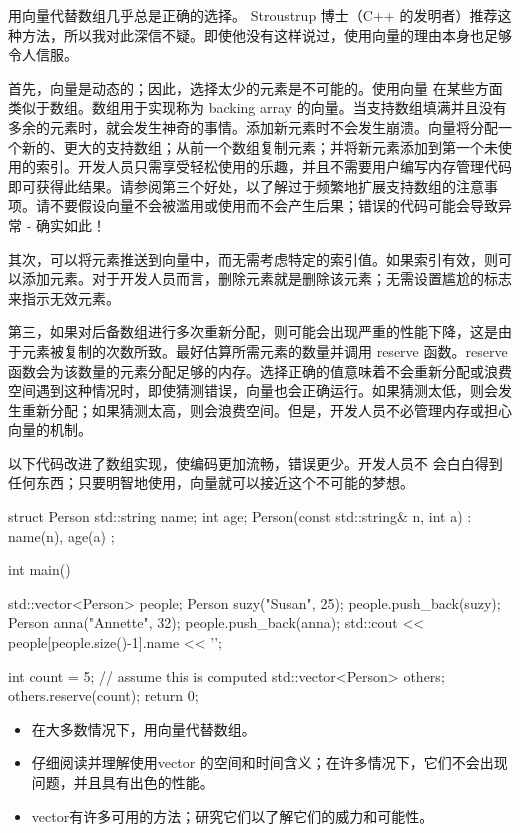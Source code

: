 
用向量代替数组几乎总是正确的选择。 Stroustrup 博士（C++ 的发明者）推荐这种方法，所以我对此深信不疑。即使他没有这样说过，使用向量的理由本身也足够令人信服。

首先，向量是动态的；因此，选择太少的元素是不可能的。使用向量 在某些方面类似于数组。数组用于实现称为 backing array 的向量。当支持数组填满并且没有多余的元素时，就会发生神奇的事情。添加新元素时不会发生崩溃。向量将分配一个新的、更大的支持数组；从前一个数组复制元素；并将新元素添加到第一个未使用的索引。开发人员只需享受轻松使用的乐趣，并且不需要用户编写内存管理代码即可获得此结果。请参阅第三个好处，以了解过于频繁地扩展支持数组的注意事项。请不要假设向量不会被滥用或使用而不会产生后果；错误的代码可能会导致异常 - 确实如此！

其次，可以将元素推送到向量中，而无需考虑特定的索引值。如果索引有效，则可以添加元素。对于开发人员而言，删除元素就是删除该元素；无需设置尴尬的标志来指示无效元素。

第三，如果对后备数组进行多次重新分配，则可能会出现严重的性能下降，这是由于元素被复制的次数所致。最好估算所需元素的数量并调用 reserve 函数。reserve 函数会为该数量的元素分配足够的内存。选择正确的值意味着不会重新分配或浪费空间遇到这种情况时，即使猜测错误，向量也会正确运行。如果猜测太低，则会发生重新分配；如果猜测太高，则会浪费空间。但是，开发人员不必管理内存或担心向量的机制。

以下代码改进了数组实现，使编码更加流畅，错误更少。开发人员不 会白白得到任何东西；只要明智地使用，向量就可以接近这个不可能的梦想。


\begin{cpp}
struct Person {
  std::string name;
  int age;
  Person(const std::string& n, int a) : name(n), age(a) {}
};

int main() {
  std::vector<Person> people;
  Person suzy("Susan", 25);
  people.push_back(suzy);
  Person anna("Annette", 32);
  people.push_back(anna);
  std::cout << people[people.size()-1].name << '\n';

  int count = 5; // assume this is computed
  std::vector<Person> others;
  others.reserve(count);
  return 0;
}
\end{cpp}


\begin{itemize}
\item
在大多数情况下，用向量代替数组。

\item
仔细阅读并理解使用vector 的空间和时间含义；在许多情况下，它们不会出现问题，并且具有出色的性能。

\item
vector有许多可用的方法；研究它们以了解它们的威力和可能性。
\end{itemize}













